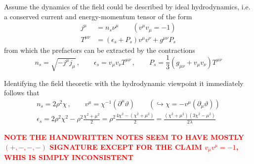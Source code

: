 Assume the dynamics of the field could be described by ideal hydrodynamics, i.e. a conserved current and energy-momentum tensor of the form 
\begin{subequations}
    \begin{align}
        j^\mu      & =n_s\nu^\mu\qquad(v^\mu v_\mu=-1)          \\
        T^{\mu\nu} & =(\epsilon_s+P_s)v^\mu v^\nu+g^{\mu\nu}P_s
    \end{align}
\end{subequations}
from which the prefactors can be extracted by the contractions
\begin{equation}
    n_s=\sqrt{-j^\mu j_\mu}\,,\qquad\epsilon_s=v_\mu v_\nu T^{\mu\nu}\,,\qquad P_s=\frac{1}{3}(g_{\mu\nu}+v_\mu v_\nu)T^{\mu\nu}
\end{equation}

Identifying the field theoretic with the hydrodynamic viewpoint it immediately follows that
\begin{subequations}
    \begin{gather}
        n_s=2\rho^2\chi\,,\qquad v^\mu=\chi^{-1}(\partial^\mu\vartheta)\qquad(\hookrightarrow\chi=-v^\mu(\partial_\mu\vartheta))\\
        \epsilon_s=2\rho^2\chi^2-\rho^2\frac{\chi^2+\mu^2}{2}=\rho^2\frac{4\chi^2-(\chi^2+\mu^2)}{2}=\frac{(\chi^2+\mu^2)(3\chi^2-\mu^2)}{2\lambda}
    \end{gather}
\end{subequations}

\textcolor{red}{\textbf{NOTE THE HANDWRITTEN NOTES SEEM TO HAVE MOSTLY $(+,-,-,-)$ SIGNATURE EXCEPT FOR THE CLAIM $v_\mu v^\mu=-1$, WHIS IS SIMPLY INCONSISTENT}}
